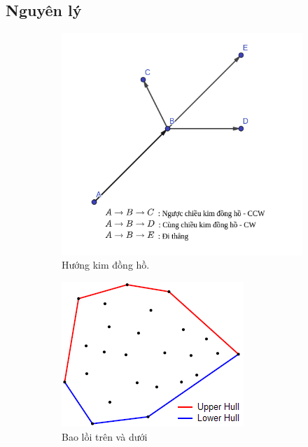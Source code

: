 \documentclass[12pt]{article}
\begin{document}
      \subsection{Nguyên lý}
        \begin{figure}[!ht]
          \centering
          \begin{subfigure}[b]{0.4\linewidth}
            \includegraphics[width=\linewidth]{Image/cw}
            \caption{Hướng kim đồng hồ.}
            \label{fig:ccw} 
          \end{subfigure}
          \begin{subfigure}[b]{0.4\linewidth}
            \includegraphics[width=\linewidth]{Image/upperandlower}
            \caption{Bao lồi trên và dưới}
            \label{fig:uplow} 
          \end{subfigure}
          \caption{}
        \end{figure}
\end{document}
